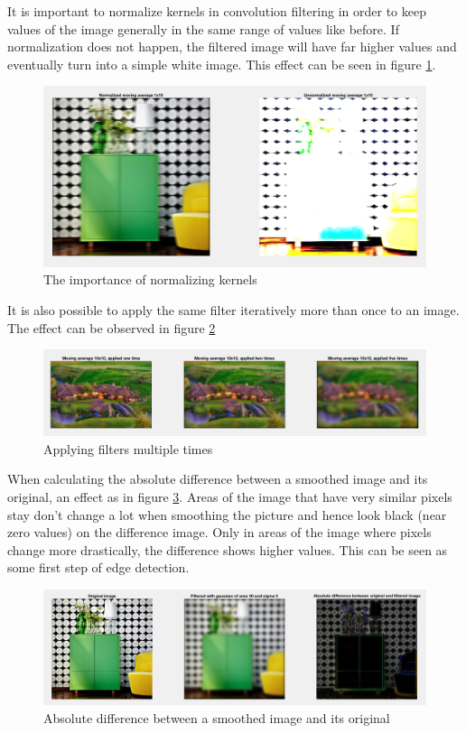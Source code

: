 It is important to normalize kernels in convolution filtering in order to keep values of the image generally in the same range of values like before. If normalization does not happen, the filtered image will have far higher values and eventually turn into a simple white image. This effect can be seen in figure \ref{fig:task15}.

\begin{figure}[!hbt]
  \includegraphics[width=\textwidth]{./img/task15.png}
  \caption{The importance of normalizing kernels}
  \label{fig:task15}
\end{figure}

It is also possible to apply the same filter iteratively more than once to an image. The effect can be observed in figure \ref{fig:task16}

\begin{figure}[!hbt]
  \includegraphics[width=\textwidth]{./img/task16.png}
  \caption{Applying filters multiple times}
  \label{fig:task16}
\end{figure}

When calculating the absolute difference between a smoothed image and its original, an effect as in figure \ref{fig:task17}. Areas of the image that have very similar pixels stay don't change a lot when smoothing the picture and hence look black (near zero values) on the difference image. Only in areas of the image where pixels change more drastically, the difference shows higher values. This can be seen as some first step of edge detection.

\begin{figure}[!hbt]
  \includegraphics[width=\textwidth]{./img/task17.png}
  \caption{Absolute difference between a smoothed image and its original}
  \label{fig:task17}
\end{figure}
